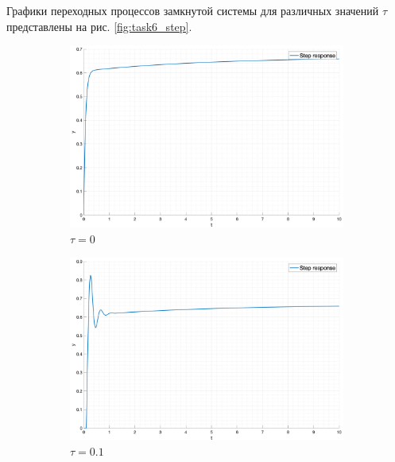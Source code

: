 Графики переходных процессов замкнутой системы для различных значений $\tau$ представлены на рис. \ref{fig:task6_step}.
\begin{figure}[ht!]
    \begin{subfigure}{0.5\textwidth}
        \centering
        \includegraphics[width=\textwidth]{media/plots/task6_step_response_closed_1.png}
        \caption{$\tau = 0$}
    \end{subfigure}
    \begin{subfigure}{0.5\textwidth}
        \centering
        \includegraphics[width=\textwidth]{media/plots/task6_step_response_closed_2.png}
        \caption{$\tau = 0.1$}
    \end{subfigure}
    \begin{subfigure}{0.5\textwidth}
        \centering

\end{subfigure}
\end{figure}
